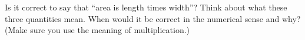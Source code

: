 %
%
%

\begin{prob}
Is it correct to say that ``area is length times width''?  Think about what these three quantities mean.  When would it be correct in the numerical sense and why?  (Make sure you use the meaning of multiplication.)   
\end{prob}



